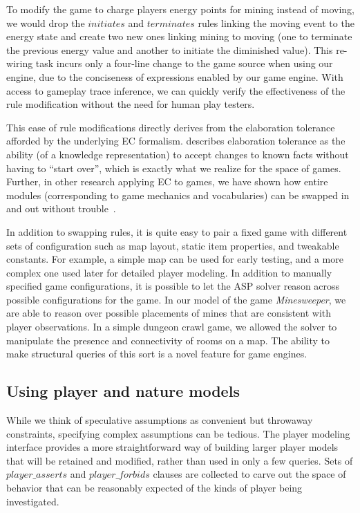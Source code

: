 \documentclass[letterpaper]{article}
\newcommand{\logical}[1]{$#1$}
\begin{document}
To modify the game to charge players energy points for mining instead of
moving, we would drop the \logical{initiates} and \logical{terminates} rules
linking the moving event to the energy state and create two new ones linking
mining to moving (one to terminate the previous energy value and another to
initiate the diminished value). This re-wiring task incurs only a four-line
change to the game source when using our engine, due to the conciseness of
expressions enabled by our game engine.  With access to gameplay trace
inference, we can quickly verify the effectiveness of the rule modification
without the need for human play testers.

This ease of rule modifications directly derives from the elaboration tolerance
afforded by the underlying EC formalism.  \citet{McCarthy:elaboration}
describes elaboration tolerance as the ability (of a knowledge representation)
to accept changes to known facts without having to ``start over'', which is exactly
what we realize for the space of games. Further, in other research applying EC
to games, we have shown how entire modules (corresponding to game mechanics and
vocabularies) can be swapped in and out without trouble~\citep{AIIDE08}.

In addition to swapping rules, it is quite easy to pair a fixed game with
different sets of configuration such as map layout, static item properties, and
tweakable constants.  For example, a simple map can be used for early testing,
and a more complex one used later for detailed player modeling.  In addition to
manually specified game configurations, it is possible to let the ASP solver
reason across possible configurations for the game. In our model of the game
\emph{Minesweeper}, we are able to reason over possible placements of mines
that are consistent with player observations. In a simple dungeon crawl game,
we allowed the solver to manipulate the presence and connectivity of rooms on a
map. The ability to make structural queries of this sort is a novel feature for
game engines.

\subsection{Using player and nature models}

While we think of speculative assumptions as convenient but throwaway
constraints, specifying complex assumptions can be tedious. The player modeling
interface provides a more straightforward way of building larger player models
that will be retained and modified, rather than used in only a few queries.
Sets of \logical{player\_asserts} and \logical{player\_forbids} clauses are
collected to carve out the space of behavior that can be reasonably expected of
the kinds of player being investigated.
\end{document}
